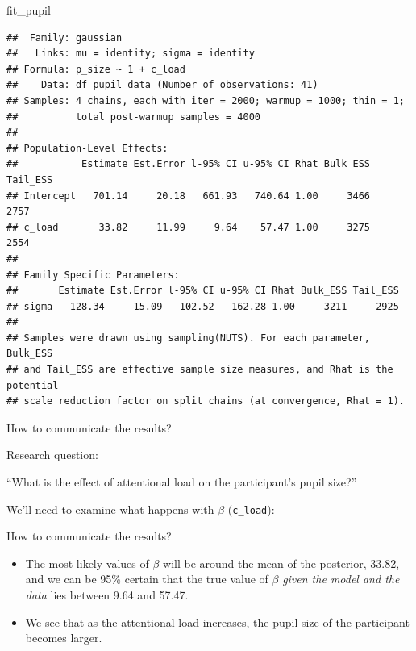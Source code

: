 \documentclass[12pt,ignorenonframetext,aspectratio=169]{beamer}
\newenvironment{Shaded}{\begin{snugshade}}{\end{snugshade}}
\newcommand{\NormalTok}[1]{#1}
\providecommand{\tightlist}{%
  \setlength{\itemsep}{0pt}\setlength{\parskip}{0pt}}
\begin{document}
\begin{frame}[fragile]

\scriptsize

\begin{Shaded}
\begin{Highlighting}[]
\NormalTok{fit_pupil}
\end{Highlighting}
\end{Shaded}

\begin{verbatim}
##  Family: gaussian 
##   Links: mu = identity; sigma = identity 
## Formula: p_size ~ 1 + c_load 
##    Data: df_pupil_data (Number of observations: 41) 
## Samples: 4 chains, each with iter = 2000; warmup = 1000; thin = 1;
##          total post-warmup samples = 4000
## 
## Population-Level Effects: 
##           Estimate Est.Error l-95% CI u-95% CI Rhat Bulk_ESS Tail_ESS
## Intercept   701.14     20.18   661.93   740.64 1.00     3466     2757
## c_load       33.82     11.99     9.64    57.47 1.00     3275     2554
## 
## Family Specific Parameters: 
##       Estimate Est.Error l-95% CI u-95% CI Rhat Bulk_ESS Tail_ESS
## sigma   128.34     15.09   102.52   162.28 1.00     3211     2925
## 
## Samples were drawn using sampling(NUTS). For each parameter, Bulk_ESS
## and Tail_ESS are effective sample size measures, and Rhat is the potential
## scale reduction factor on split chains (at convergence, Rhat = 1).
\end{verbatim}

\normalsize

\end{frame}

\begin{frame}[fragile]{How to communicate the results?}
\protect\hypertarget{how-to-communicate-the-results}{}

\small

\normalsize

\begin{block}{Research question:}

``What is the effect of attentional load on the participant's pupil size?''

We'll need to examine what happens with \(\beta\) (\texttt{c\_load}):

\end{block}

\end{frame}

\begin{frame}{How to communicate the results?}
\protect\hypertarget{how-to-communicate-the-results-1}{}

\begin{itemize}
\tightlist
\item
  The most likely values of \(\beta\) will be around the mean of the posterior, 33.82, and we can be 95\% certain that the true value of \(\beta\) \emph{given the model and the data} lies between 9.64 and 57.47.
\item
  We see that as the attentional load increases, the pupil size of the participant becomes larger.
\end{itemize}

\end{frame}
\end{document}

